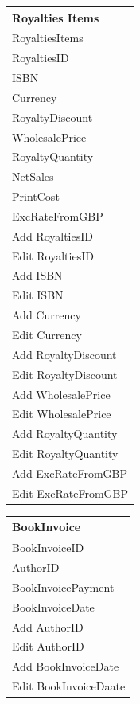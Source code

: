 \begin{tabular}{|p{4cm}|}
    \hline
    \textbf{Royalties Items} \\ \hline
    RoyaltiesItems \\ RoyaltiesID \\ ISBN \\ Currency \\ RoyaltyDiscount \\ WholesalePrice \\ RoyaltyQuantity \\ NetSales \\ PrintCost \\ ExcRateFromGBP \\ \hline
    Add RoyaltiesID \\ Edit RoyaltiesID \\ Add ISBN \\ Edit ISBN \\ Add Currency \\ Edit Currency \\ Add RoyaltyDiscount \\ Edit RoyaltyDiscount \\ Add WholesalePrice \\ Edit WholesalePrice \\ Add RoyaltyQuantity \\ Edit RoyaltyQuantity \\ Add ExcRateFromGBP \\ Edit ExcRateFromGBP \\ \hline
\end{tabular}

\begin{tabular}{|p{4cm}|}
    \hline
    \textbf{BookInvoice} \\ \hline
    BookInvoiceID \\ AuthorID \\ BookInvoicePayment \\ BookInvoiceDate \\ \hline
    Add AuthorID \\ Edit AuthorID \\ Add BookInvoiceDate \\ Edit BookInvoiceDaate \\ \hline
\end{tabular}

